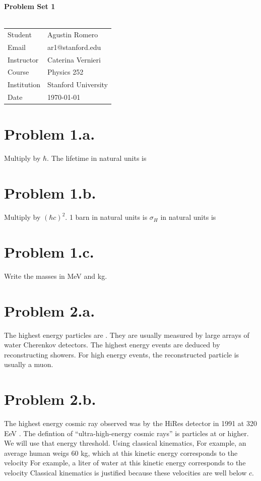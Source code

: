 \documentclass{article}
\begin{document}
\begin{center}
\textbf{\Large{Problem Set 1}}\\~\\
\begin{tabular}{l l}
Student&Agustin Romero\\
Email&ar1@stanford.edu\\
Instructor&Caterina Vernieri\\
Course&Physics 252\\
Institution&Stanford University\\
Date&\today\\
\end{tabular}
\end{center}
\section*{Problem 1.a.}
Multiply by $\hbar$. The lifetime in natural units is
\section*{Problem 1.b.}
Multiply by $(\hbar c)^2$.
1 barn in natural units is
$\sigma_H$ in natural units is
\section*{Problem 1.c.}
Write the masses in MeV and kg.
\section*{Problem 2.a.}
The highest energy particles are . They are usually measured by large arrays of water Cherenkov detectors. The highest energy events are deduced by reconstructing showers. For high energy events, the reconstructed particle is usually a muon.
\section*{Problem 2.b.}
The highest energy cosmic ray observed was by the HiRes detector in 1991 at 320 EeV \cite{c}. The defintion of ``ultra-high-energy cosmic rays'' is particles at
or higher. We will use that energy threshold. Using classical kinematics,
For example, an average human weigs 60 kg, which at this kinetic energy corresponds to the velocity
For example, a liter of water at this kinetic energy corresponds to the velocity
Classical kinematics is justified because these velocities are well below $c$.
\end{document}
